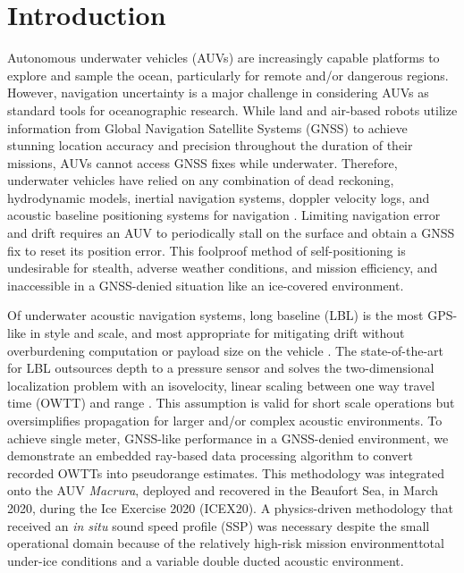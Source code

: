 
\maketitle


\section{Introduction}
\label{sec:1}  
Autonomous underwater vehicles (AUVs) are increasingly capable platforms to explore and sample the ocean, particularly for remote and/or dangerous regions.
However, navigation uncertainty is a major challenge in considering AUVs as standard tools for oceanographic research.
While land and air-based robots utilize information from Global Navigation Satellite Systems (GNSS) to achieve stunning location accuracy and precision throughout the duration of their missions, AUVs cannot access GNSS fixes while underwater.
Therefore, underwater vehicles have relied on any combination of dead reckoning, hydrodynamic models, inertial navigation systems, doppler velocity logs, and acoustic baseline positioning systems for navigation \citep{Paull2014}.
Limiting navigation error and drift requires an AUV to periodically stall on the surface and obtain a GNSS fix to reset its position error.
This foolproof method of self-positioning is undesirable for stealth, adverse weather conditions, and mission efficiency, and inaccessible in a GNSS-denied situation like an ice-covered environment.

Of underwater acoustic navigation systems, long baseline (LBL) is the most GPS-like in style and scale, and most appropriate for mitigating drift without overburdening computation or payload size on the vehicle \citep{VanUffelen2021}.
The state-of-the-art for LBL outsources depth to a pressure sensor and solves the two-dimensional localization problem with an isovelocity, linear scaling between one way travel time (OWTT) and range \citep{Eustice2006,Eustice2007,Webster2009,Webster2012}.
This assumption is valid for short scale operations but oversimplifies propagation for larger and/or complex acoustic environments.
To achieve single meter, GNSS-like performance in a GNSS-denied environment, we demonstrate an embedded ray-based data processing algorithm to convert recorded OWTTs into pseudorange estimates.
This methodology was integrated onto the AUV \emph{Macrura}, deployed and recovered in the Beaufort Sea, in March 2020, during the Ice Exercise 2020 (ICEX20).
A physics-driven methodology that received an \textit{in situ} sound speed profile (SSP) was necessary despite the small operational domain because of the relatively high-risk mission environment\textemdash total under-ice conditions and a variable double ducted acoustic environment.

